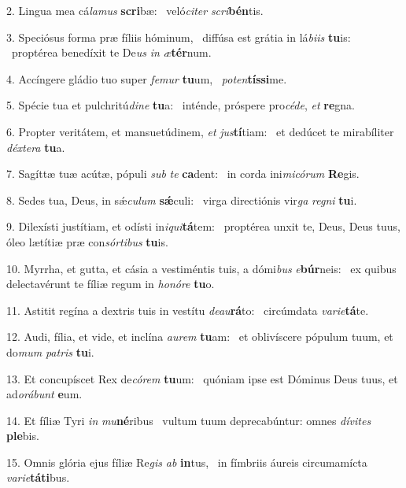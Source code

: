 2. Lingua mea cá\textit{la}\textit{mus} \textbf{scri}bæ: \ast\  veló\textit{ci}\textit{ter} \textit{scri}\textbf{bén}tis.\

3. Speciósus forma præ fíliis hóminum, \dag\  diffúsa est grátia in lá\textit{bi}\textit{is} \textbf{tu}is: \ast\  proptérea benedíxit te De\textit{us} \textit{in} \textit{æ}\textbf{tér}num.\

4. Accíngere gládio tuo super \textit{fe}\textit{mur} \textbf{tu}um, \ast\  \textit{pot}\textit{en}\textbf{tís}\textbf{si}me.\

5. Spécie tua et pulchritú\textit{di}\textit{ne} \textbf{tu}a: \ast\  inténde, próspere pro\textit{cé}\textit{de}, \textit{et} \textbf{re}gna.\

6. Propter veritátem, et mansuetúdinem, \textit{et} \textit{jus}\textbf{tí}tiam: \ast\  et dedúcet te mirabíliter \textit{déx}\textit{te}\textit{ra} \textbf{tu}a.\

7. Sagíttæ tuæ acútæ, pópuli \textit{sub} \textit{te} \textbf{ca}dent: \ast\  in corda ini\textit{mi}\textit{có}\textit{rum} \textbf{Re}gis.\

8. Sedes tua, Deus, in sǽ\textit{cu}\textit{lum} \textbf{sǽ}culi: \ast\  virga directiónis vir\textit{ga} \textit{re}\textit{gni} \textbf{tu}i.\

9. Dilexísti justítiam, et odísti in\textit{i}\textit{qui}\textbf{tá}tem: \ast\  proptérea unxit te, Deus, Deus tuus, óleo lætítiæ præ con\textit{sór}\textit{ti}\textit{bus} \textbf{tu}is.\

10. Myrrha, et gutta, et cásia a vestiméntis tuis, a dómi\textit{bus} \textit{e}\textbf{búr}neis: \ast\  ex quibus delectavérunt te fíliæ regum in \textit{ho}\textit{nó}\textit{re} \textbf{tu}o.\

11. Astitit regína a dextris tuis in vestítu \textit{de}\textit{au}\textbf{rá}to: \ast\  circúmdata \textit{va}\textit{ri}\textit{e}\textbf{tá}te.\

12. Audi, fília, et vide, et inclína \textit{au}\textit{rem} \textbf{tu}am: \ast\  et oblivíscere pópulum tuum, et do\textit{mum} \textit{pa}\textit{tris} \textbf{tu}i.\

13. Et concupíscet Rex de\textit{có}\textit{rem} \textbf{tu}um: \ast\  quóniam ipse est Dóminus Deus tuus, et ad\textit{o}\textit{rá}\textit{bunt} \textbf{e}um.\

14. Et fíliæ Tyri \textit{in} \textit{mu}\textbf{né}ribus \ast\  vultum tuum deprecabúntur: omnes \textit{dí}\textit{vi}\textit{tes} \textbf{ple}bis.\

15. Omnis glória ejus fíliæ Re\textit{gis} \textit{ab} \textbf{in}tus, \ast\  in fímbriis áureis circumamícta \textit{va}\textit{ri}\textit{e}\textbf{tá}\textbf{ti}bus.\

